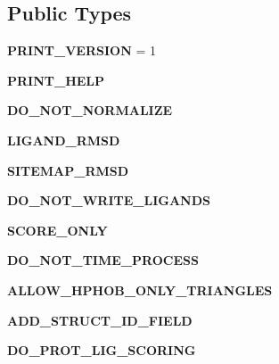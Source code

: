 \subsection*{Public Types}
\begin{CompactItemize}
\item 
\textbf{PRINT\_\-VERSION} = 1\label{classSimSite3D_1_1SearchParameters_0278737369e96b0ca8d7685578a160d523d6d6cc3c507f57dbfb27c66de5af61}

\item 
\textbf{PRINT\_\-HELP}\label{classSimSite3D_1_1SearchParameters_0278737369e96b0ca8d7685578a160d5946fe3b6fb33a3f1a1f1bfcb799e7f57}

\item 
\textbf{DO\_\-NOT\_\-NORMALIZE}\label{classSimSite3D_1_1SearchParameters_0278737369e96b0ca8d7685578a160d56d064d2864a74b09ebb91ade006be98b}

\item 
\textbf{LIGAND\_\-RMSD}\label{classSimSite3D_1_1SearchParameters_0278737369e96b0ca8d7685578a160d539c302e55fa4a62c9fc42ddaf0aecf79}

\item 
\textbf{SITEMAP\_\-RMSD}\label{classSimSite3D_1_1SearchParameters_0278737369e96b0ca8d7685578a160d5be2fcd7debcbc43f9246f2e96a55b061}

\item 
\textbf{DO\_\-NOT\_\-WRITE\_\-LIGANDS}\label{classSimSite3D_1_1SearchParameters_0278737369e96b0ca8d7685578a160d5842ee3990d6101fe149155fb635857f8}

\item 
\textbf{SCORE\_\-ONLY}\label{classSimSite3D_1_1SearchParameters_0278737369e96b0ca8d7685578a160d56cca043172e95be1ac3a62aa07b3e929}

\item 
\textbf{DO\_\-NOT\_\-TIME\_\-PROCESS}\label{classSimSite3D_1_1SearchParameters_0278737369e96b0ca8d7685578a160d5df4956ce18d7222d72380e017a2f08a0}

\item 
\textbf{ALLOW\_\-HPHOB\_\-ONLY\_\-TRIANGLES}\label{classSimSite3D_1_1SearchParameters_0278737369e96b0ca8d7685578a160d5ff8d9bfbd20c4d153faebdc41c3a6850}

\item 
\textbf{ADD\_\-STRUCT\_\-ID\_\-FIELD}\label{classSimSite3D_1_1SearchParameters_0278737369e96b0ca8d7685578a160d57ed6e1e5168b8f6cc426662e6d3dcff8}

\item 
\textbf{DO\_\-PROT\_\-LIG\_\-SCORING}\label{classSimSite3D_1_1SearchParameters_0278737369e96b0ca8d7685578a160d58f07579b71a52c91abe56ecb74b4ff36}


\end{CompactItemize}
